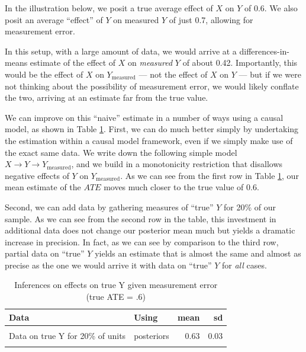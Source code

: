\documentclass[
  12pt,
]{book}
\begin{document}
In the illustration below, we posit a true average effect of \(X\) on \(Y\) of 0.6. We also posit an average ``effect'' of \(Y\) on measured \(Y\) of just 0.7, allowing for measurement error.

In this setup, with a large amount of data, we would arrive at a differences-in-means estimate of the effect of \(X\) on \emph{measured} \(Y\) of about 0.42. Importantly, this would be the effect of \(X\) on \(Y_{\text{measured}}\) --- not the effect of \(X\) on \(Y\) --- but if we were not thinking about the possibility of measurement error, we would likely conflate the two, arriving at an estimate far from the true value.

We can improve on this ``naive'' estimate in a number of ways using a causal model, as shown in Table \ref{tab:measurmenterror}. First, we can do much better simply by undertaking the estimation within a causal model framework, even if we simply make use of the exact same data. We write down the following simple model \(X \rightarrow Y \rightarrow Y_\text{measured}\), and we build in a monotonicity restriction that disallows negative effects of \(Y\) on \(Y_{\text{measured}}\). As we can see from the first row in Table \ref{tab:measurmenterror}, our mean estimate of the \(ATE\) moves much closer to the true value of 0.6.

Second, we can add data by gathering measures of ``true'' \(Y\) for 20\% of our sample. As we can see from the second row in the table, this investment in additional data does not change our posterior mean much but yields a dramatic increase in precision. In fact, as we can see by comparison to the third row, partial data on ``true'' \(Y\) yields an estimate that is almost the same and almost as precise as the one we would arrive it with data on ``true'' \(Y\) for \emph{all} cases.

\begin{table}

\caption{\label{tab:measurmenterror}Inferences on effects on true Y given measurement error (true ATE = .6)}
\centering
\begin{tabular}[t]{llrr}
\toprule
Data & Using & mean & sd\\
\midrule
\cellcolor{gray!6}{Data on Y measured only} & \cellcolor{gray!6}{posteriors} & \cellcolor{gray!6}{0.64} & \cellcolor{gray!6}{0.09}\\
Data on true Y for 20\% of units & posteriors & 0.63 & 0.03\\
\cellcolor{gray!6}{Data on true Y} & \cellcolor{gray!6}{posteriors} & \cellcolor{gray!6}{0.61} & \cellcolor{gray!6}{0.02}\\
\bottomrule
\end{tabular}
\end{table}
\end{document}
